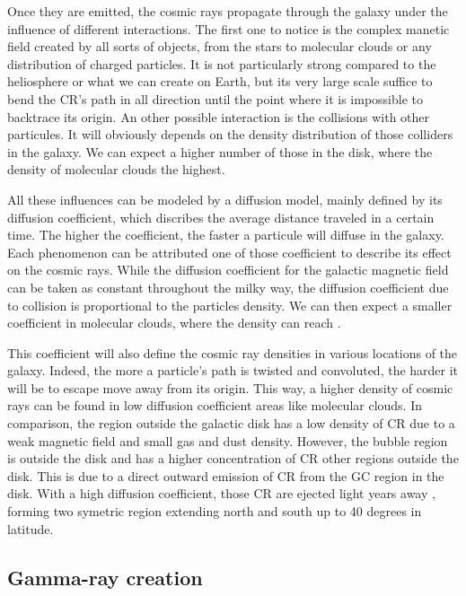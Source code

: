Once they are emitted, the cosmic rays propagate through the galaxy under the influence of different interactions.
The first one to notice is the complex manetic field created by all sorts of objects, from the stars to molecular clouds or any distribution of charged particles. It is not particularly strong  compared to the heliosphere or what we can create on Earth, but its very large scale suffice to bend the CR's path in all direction until the point where it is impossible to backtrace its origin.
An other possible interaction is the collisions with other particules. It will obviously depends on the density distribution of those colliders in the galaxy. We can expect a higher number of those in the disk, where the density of molecular clouds the highest.

All these influences can be modeled by a diffusion model, mainly defined by its diffusion coefficient, which discribes the average distance traveled in a certain time. The higher the coefficient, the faster a particule will diffuse in the galaxy. Each phenomenon can be attributed one of those coefficient to describe its effect on the cosmic rays. 
While the diffusion coefficient for the galactic magnetic field can be taken as constant throughout the milky way, the diffusion coefficient due to collision is proportional to the particles density. We can then expect a smaller coefficient in molecular clouds, where the density can reach .

This coefficient will also define the cosmic ray densities in various locations of the galaxy. Indeed, the more a particle's path is twisted and convoluted, the harder it will be to escape move away from its origin. This way, a higher density of cosmic rays can be found in low diffusion coefficient areas like molecular clouds. In comparison, the region outside the galactic disk has a low density of CR due to a weak magnetic field and small gas and dust density. However, the bubble region is outside the disk and has a higher concentration of CR other regions outside the disk. This is due to a direct outward emission of CR from the GC region in the disk. With a high diffusion coefficient, those CR are ejected light years away , forming two symetric region extending north and south up to 40 degrees in latitude.


\subsection{Gamma-ray creation}


